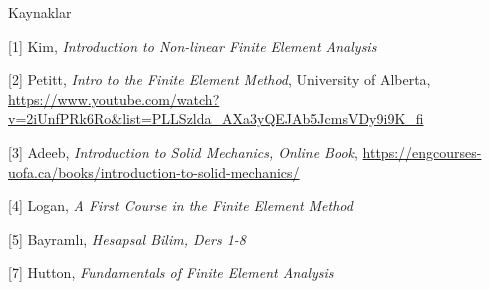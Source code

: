 \documentclass[12pt,fleqn]{article}\usepackage{../../common}
\begin{document}
Kaynaklar

[1] Kim, {\em Introduction to Non-linear Finite Element Analysis}

[2] Petitt, {\em Intro to the Finite Element Method}, University of Alberta,
    \url{https://www.youtube.com/watch?v=2iUnfPRk6Ro&list=PLLSzlda_AXa3yQEJAb5JcmsVDy9i9K_fi}
    
[3] Adeeb, {\em Introduction to Solid Mechanics, Online Book},
    \url{https://engcourses-uofa.ca/books/introduction-to-solid-mechanics/}

[4] Logan, {\em A First Course in the Finite Element Method}

[5] Bayramlı, {\em Hesapsal Bilim, Ders 1-8}

[7] Hutton, {\em Fundamentals of Finite Element Analysis}
\end{document}
